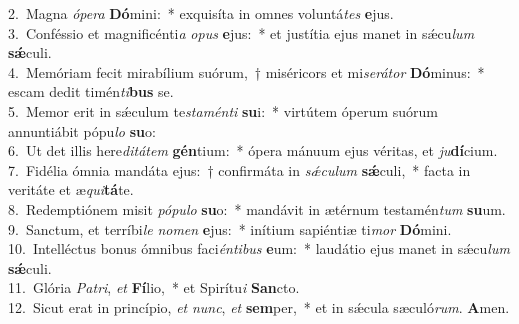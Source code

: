 {2.~}Magna \textit{ó}\textit{pe}\textit{ra} \textbf{Dó}mini:~* exquisíta in omnes voluntá\textit{tes} \textbf{e}jus.\\
{3.~}Conféssio et magnificénti\textit{a} \textit{o}\textit{pus} \textbf{e}jus:~* et justítia ejus manet in sǽcu\textit{lum} \textbf{sǽ}culi.\\
{4.~}Memóriam fecit mirabílium suórum,~† miséricors et mi\textit{se}\textit{rá}\textit{tor} \textbf{Dó}minus:~* escam dedit timén\textit{ti}\textbf{bus} se.\\
{5.~}Memor erit in sǽculum te\textit{sta}\textit{mén}\textit{ti} \textbf{su}i:~* virtútem óperum suórum annuntiábit pópu\textit{lo} \textbf{su}o:\\
{6.~}Ut det illis here\textit{di}\textit{tá}\textit{tem} \textbf{gén}tium:~* ópera mánuum ejus véritas, et \textit{ju}\textbf{dí}cium.\\
{7.~}Fidélia ómnia mandáta ejus:~† confirmáta in \textit{sǽ}\textit{cu}\textit{lum} \textbf{sǽ}culi,~* facta in veritáte et æ\textit{qui}\textbf{tá}te.\\
{8.~}Redemptiónem misit \textit{pó}\textit{pu}\textit{lo} \textbf{su}o:~* mandávit in ætérnum testamén\textit{tum} \textbf{su}um.\\
{9.~}Sanctum, et terríbi\textit{le} \textit{no}\textit{men} \textbf{e}jus:~* inítium sapiéntiæ ti\textit{mor} \textbf{Dó}mini.\\
{10.~}Intelléctus bonus ómnibus faci\textit{én}\textit{ti}\textit{bus} \textbf{e}um:~* laudátio ejus manet in sǽcu\textit{lum} \textbf{sǽ}culi.\\
{11.~}Glória \textit{Pa}\textit{tri}, \textit{et} \textbf{Fí}lio,~* et Spirítu\textit{i} \textbf{San}cto.\\
{12.~}Sicut erat in princípio, \textit{et} \textit{nunc}, \textit{et} \textbf{sem}per,~* et in sǽcula sæculó\textit{rum}. \textbf{A}men.\\
